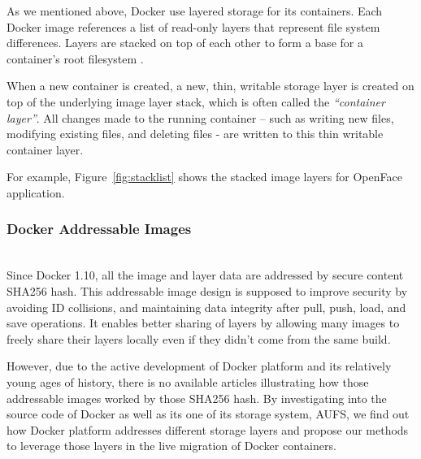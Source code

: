 As we mentioned above, Docker use layered storage for its containers. Each Docker image references a list of read-only layers that represent file system differences. Layers are stacked on top of each other to form a base for a container’s root filesystem \cite{dockerlayer}. 


When a new container is created, a new, thin, writable storage layer is created on top of the underlying image layer stack, which is often called the \textit{``container layer''}. All changes made to the running container -- such as writing new files, modifying existing files, and deleting files - are written to this thin writable container layer\cite{dockerlayer}.

For example, 
Figure~\ref{fig:stacklist} shows the stacked image layers for OpenFace application.




\subsubsection{Docker Addressable Images}~\\
Since Docker 1.10, all the image and layer data are addressed by secure content SHA256 hash. 
This addressable image design is supposed to improve security by avoiding ID collisions, and maintaining data integrity after pull, push, load, and save operations. It enables better sharing of layers by allowing many images to freely share their layers locally even if they didn’t come from the same build\cite{dockerlayer}. 

However, due to the active development of Docker platform and its relatively young ages of history, there is no available articles illustrating how those addressable images worked by those SHA256 hash. 
By investigating into the source code of Docker as well as its one of its storage system, AUFS, we find out how Docker platform addresses different storage layers and propose our methods to leverage those layers in the live migration of Docker containers.

